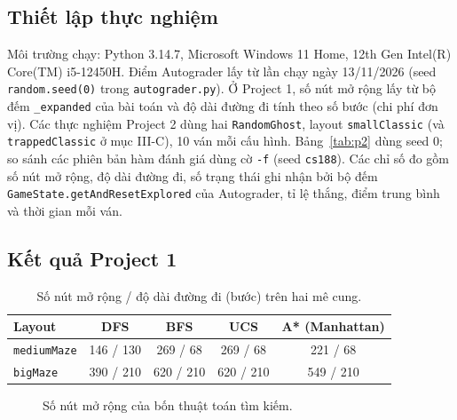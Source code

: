 \documentclass[conference]{IEEEtran}
\begin{document}
\subsection{Thiết lập thực nghiệm}
Môi trường chạy: Python 3.14.7, Microsoft Windows 11 Home, 12th Gen Intel(R) Core(TM) i5-12450H. Điểm Autograder lấy từ lần chạy ngày 13/11/2026 (seed \texttt{random.seed(0)} trong \texttt{autograder.py}). Ở Project 1, số nút mở rộng lấy từ bộ đếm \texttt{\_expanded} của bài toán và độ dài đường đi tính theo số bước (chi phí đơn vị). Các thực nghiệm Project 2 dùng hai \texttt{RandomGhost}, layout \texttt{smallClassic} (và \texttt{trappedClassic} ở mục III-C), 10 ván mỗi cấu hình. Bảng~\ref{tab:p2} dùng seed 0; so sánh các phiên bản hàm đánh giá dùng cờ \texttt{-f} (seed \texttt{cs188}). Các chỉ số đo gồm số nút mở rộng, độ dài đường đi, số trạng thái ghi nhận bởi bộ đếm \texttt{GameState.getAndResetExplored} của Autograder, tỉ lệ thắng, điểm trung bình và thời gian mỗi ván.

\subsection{Kết quả Project 1}
\begin{table}[!ht]
    \centering
    \scriptsize
    \setlength{\tabcolsep}{4pt}
    \caption{Số nút mở rộng / độ dài đường đi (bước) trên hai mê cung.}
    \label{tab:p1}
    \begin{tabular}{lcccc}
    \toprule
    Layout & DFS & BFS & UCS & A* (Manhattan) \\
    \midrule
    \texttt{mediumMaze} & 146 / 130 & 269 / 68 & 269 / 68 & 221 / 68 \\
    \texttt{bigMaze} & 390 / 210 & 620 / 210 & 620 / 210 & 549 / 210 \\
    \bottomrule
    \end{tabular}
\end{table}

\begin{figure}[!t]
\centering
{}
\caption{Số nút mở rộng của bốn thuật toán tìm kiếm.}
\label{fig:nodes}
\end{figure}
\end{document}
